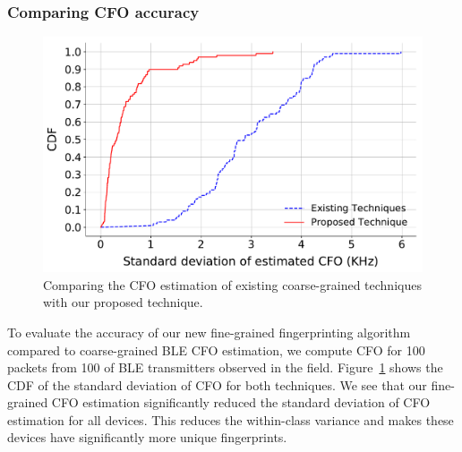 \subsubsection{Comparing CFO accuracy} %
\begin{figure}[t!]
    \centering
    \includegraphics[width = \linewidth]{plots/CFO_comparison_ESP.pdf} 
    \caption{Comparing the CFO estimation of existing coarse-grained techniques with our proposed technique.}
    \label{fig:cfo_comp}
\end{figure}


%
To evaluate the accuracy of our new fine-grained fingerprinting algorithm compared to coarse-grained BLE
CFO estimation, 
we compute CFO for 100 packets from 100 of BLE transmitters observed in the field.%
%
Figure~\ref{fig:cfo_comp} shows the CDF of the standard deviation of CFO for both techniques.
%
We see that 
our fine-grained CFO estimation significantly reduced the standard deviation of CFO estimation for all devices. This reduces the within-class variance and
makes these devices have significantly more unique fingerprints.
%

